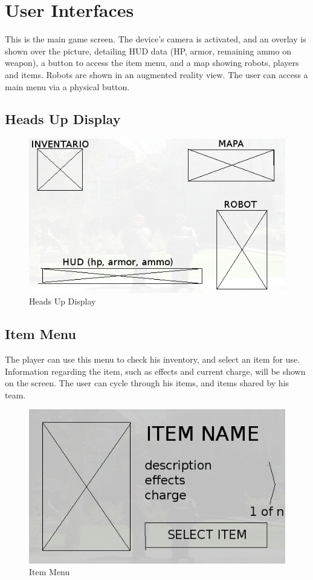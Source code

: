 \documentclass{article}
\begin{document}
\section{User Interfaces}
This is the main game screen. The device's camera is activated, and an overlay is shown over the picture, detailing HUD data (HP, armor, remaining ammo on weapon), a button to access the item menu, and a map showing robots, players and items. Robots are shown in an augmented reality view. The user can access a main menu via a physical button.
\subsection{Heads Up Display}
\begin{figure}[htb]
\centering
\includegraphics[scale=0.5]{hud}
\caption{Heads Up Display}
\end{figure}
\subsection{Item Menu}
The player can use this menu to check his inventory, and select an item for use. Information regarding the item, such as effects and current charge, will be shown on the screen. The user can cycle through his items, and items shared by his team.
\begin{figure}[htb]
\centering
\includegraphics[scale=0.5]{item-menu}
\caption{Item Menu}
\end{figure}
\end{document}
